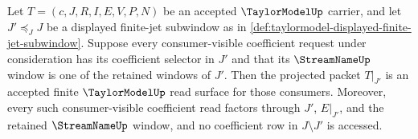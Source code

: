 \begin{proposition}
\label{prop:taylormodel-finite-jet-prefix-restriction}
Let $T=(c,J,R,I,E,V,P,N)$ be an accepted $\TaylorModelUp$ carrier, and let $J'\preceq_J J$ be a displayed finite-jet subwindow as in \autoref{def:taylormodel-displayed-finite-jet-subwindow}. Suppose every consumer-visible coefficient request under consideration has its coefficient selector in $J'$ and that its $\StreamNameUp$ window is one of the retained windows of $J'$. Then the projected packet $T\vert_{J'}$ is an accepted finite $\TaylorModelUp$ read surface for those consumers. Moreover, every such consumer-visible coefficient read factors through $J'$, $E\vert_{J'}$, and the retained $\StreamNameUp$ window, and no coefficient row in $J\setminus J'$ is accessed.
\end{proposition}
